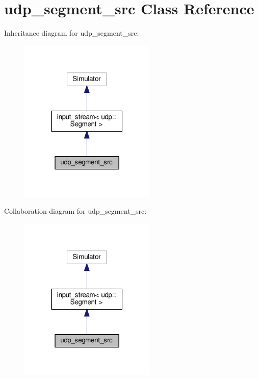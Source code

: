 \hypertarget{classudp__segment__src}{}\section{udp\+\_\+segment\+\_\+src Class Reference}
\label{classudp__segment__src}


Inheritance diagram for udp\+\_\+segment\+\_\+src\+:\nopagebreak
\begin{figure}[H]
\begin{center}
\leavevmode
\includegraphics[width=184pt]{classudp__segment__src__inherit__graph}
\end{center}
\end{figure}


Collaboration diagram for udp\+\_\+segment\+\_\+src\+:\nopagebreak
\begin{figure}[H]
\begin{center}
\leavevmode
\includegraphics[width=184pt]{classudp__segment__src__coll__graph}
\end{center}
\end{figure}
